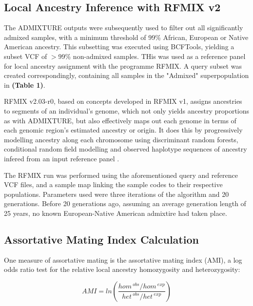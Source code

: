 \documentclass[11pt]{article}
\begin{document}
\subsection{Local Ancestry Inference with RFMIX v2}


The ADMIXTURE outputs were subsequently used to filter out all significantly admixed samples, with a minimum threshold of 99\% African, European or Native American ancestry. This subsetting was executed using BCFTools, yielding a subset VCF of $>$99\% non-admixed samples. THis was used as a reference panel for local ancestry assignment with the programme RFMIX. A query subset was created correspondingly, containing all samples in the "Admixed" superpopulation in \textbf{(Table 1)}.

RFMIX v2.03-r0, based on concepts developed in RFMIX v1, assigns ancestries to segments of an individual's genome, which not only yields ancestry proportions as with ADMIXTURE, but also effectively maps out each genome in terms of each genomic region's estimated ancestry or origin. It does this by progressively modelling ancestry along each chromosome using discriminant random forests, conditional random field modelling and observed haplotype sequences of ancestry infered from an input reference panel \parencite{Maples2013}.

The RFMIX run was performed using the aforementioned query and reference VCF files, and a sample map linking the sample codes to their respective populations. Parameters used were three iterations of the algorithm and 20 generations. Before 20 generations ago, assuming an average generation length of 25 years, no known European-Native American admixtire had taken place.





\subsection{Assortative Mating Index Calculation}


One measure of assortative mating is the assortative mating index (AMI), a log odds ratio test for the relative local ancestry homozygosity and heterozygosity:


\begin{equation}
    AMI = ln{\left( \frac{ hom^{\: obs} / hom^{\: exp} }
                         { het^{\: obs} / het^{\: exp} } \right)}
\end{equation}
\vspace{3mm}
\end{document}
